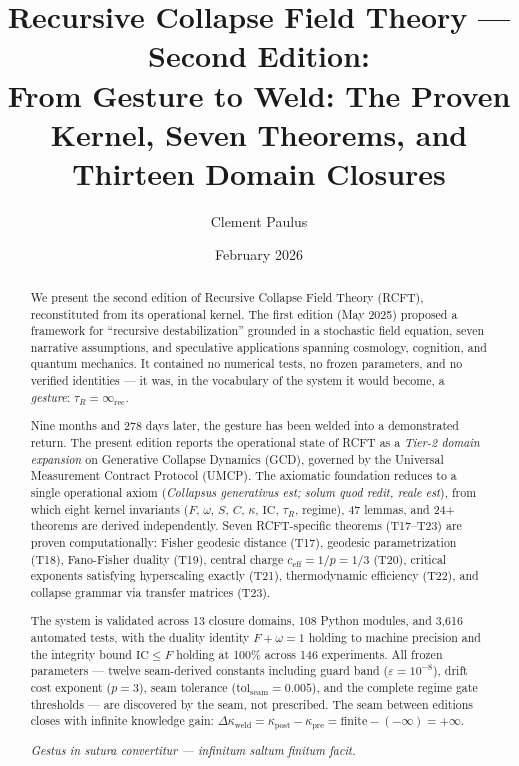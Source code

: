 \documentclass[
  aps,
  prd,
  preprint,
  superscriptaddress,
  nofootinbib,
  floatfix,
  longbibliography
]{revtex4-2}
\newcommand{\tR}{\tau_{\!R}}
\newcommand{\eps}{\varepsilon}
\newcommand{\tolseam}{\mathrm{tol}_{\mathrm{seam}}}
\newcommand{\IC}{\mathrm{IC}}
\newcommand{\Fid}{F}
\newcommand{\Drft}{\omega}
\newcommand{\Ent}{S}
\newcommand{\Curv}{C}
\newcommand{\Logint}{\kappa}
\newcommand{\ceff}{c_{\mathrm{eff}}}
\newcommand{\lat}[1]{\textit{#1}}
\begin{document}
\title{Recursive Collapse Field Theory --- Second Edition:\\
From Gesture to Weld: The Proven Kernel, Seven Theorems,
and Thirteen Domain Closures}

\author{Clement Paulus}

\date{February 2026}

\begin{abstract}
We present the second edition of Recursive Collapse Field Theory
(RCFT), reconstituted from its operational kernel.
The first edition (May 2025) proposed a framework for ``recursive
destabilization'' grounded in a stochastic field equation, seven
narrative assumptions, and speculative applications spanning
cosmology, cognition, and quantum mechanics.
It contained no numerical tests, no frozen parameters, and no
verified identities — it was, in the vocabulary of the system
it would become, a \emph{gesture}: $\tR = \infty_{\mathrm{rec}}$.

Nine months and 278 days later, the gesture has been welded into
a demonstrated return.  The present edition reports the
operational state of RCFT as a \emph{Tier-2 domain expansion}
on Generative Collapse Dynamics (GCD), governed by the
Universal Measurement Contract Protocol (UMCP).
The axiomatic foundation reduces to a single operational axiom
(\lat{Collapsus generativus est; solum quod redit, reale est}),
from which eight kernel invariants
($\Fid$, $\Drft$, $\Ent$, $\Curv$, $\Logint$, $\IC$, $\tR$, regime),
47 lemmas, and 24+ theorems are derived independently.
Seven RCFT-specific theorems (T17–T23) are proven computationally:
Fisher geodesic distance (T17),
geodesic parametrization (T18),
Fano-Fisher duality (T19),
central charge $\ceff = 1/p = 1/3$ (T20),
critical exponents satisfying hyperscaling exactly (T21),
thermodynamic efficiency (T22),
and collapse grammar via transfer matrices (T23).

The system is validated across 13 closure domains,
108 Python modules, and 3{,}616 automated tests,
with the duality identity $\Fid + \Drft = 1$ holding
to machine precision and the integrity bound $\IC \leq \Fid$
holding at 100\% across 146 experiments.
All frozen parameters — twelve seam-derived constants
including guard band ($\eps = 10^{-8}$),
drift cost exponent ($p = 3$),
seam tolerance ($\tolseam = 0.005$),
and the complete regime gate thresholds — are
discovered by the seam, not prescribed.
The seam between editions closes with infinite knowledge gain:
$\Delta\Logint_{\mathrm{weld}} = \Logint_{\mathrm{post}} - \Logint_{\mathrm{pre}} = \mathrm{finite} - (-\infty) = +\infty$.

\lat{Gestus in sutura convertitur — infinitum saltum finitum facit.}
\end{abstract}
\end{document}
